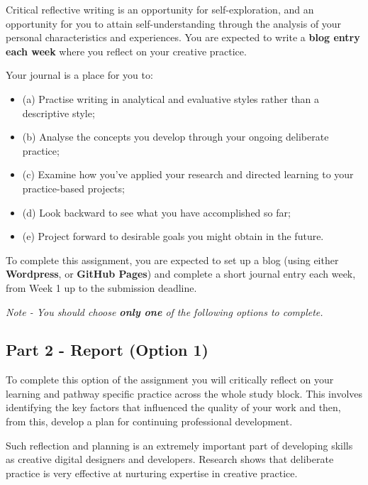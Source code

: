 \documentclass{../../fal_assignment_opendyslexic}
\begin{document}
Critical reflective writing is an opportunity for self-exploration, and an opportunity for you to attain self-understanding through the analysis of your personal characteristics and experiences. You are expected to write a \textbf{blog entry each week} where you reflect on your creative practice.

Your journal is a place for you to:
\begin{itemize}
	\item (a) Practise writing in analytical and evaluative styles rather than a descriptive style;
	\item (b) Analyse the concepts you develop through your ongoing deliberate practice;
	\item (c) Examine how you’ve applied your research and directed learning to your practice-based projects;
	\item (d) Look backward to see what you have accomplished so far;
	\item (e) Project forward to desirable goals you might obtain in the future.
\end{itemize}

To complete this assignment, you are expected to set up a blog (using either \textbf{Wordpress}, or \textbf{GitHub Pages}) and complete a short journal entry each week, from Week 1 up to the submission deadline.

\emph{Note - You should choose \textbf{only one} of the following options to complete.}
	
\subsection*{Part 2 - Report (Option 1)} 

To complete this option of the assignment you will critically reflect on your learning and pathway specific practice across the whole study block. This involves identifying the key factors that influenced the quality of your work and then, from this, develop a plan for continuing professional development.

Such reflection and planning is an extremely important part of developing skills as creative digital designers and developers. Research shows that deliberate practice is very effective at nurturing expertise in creative practice.
\end{document}
